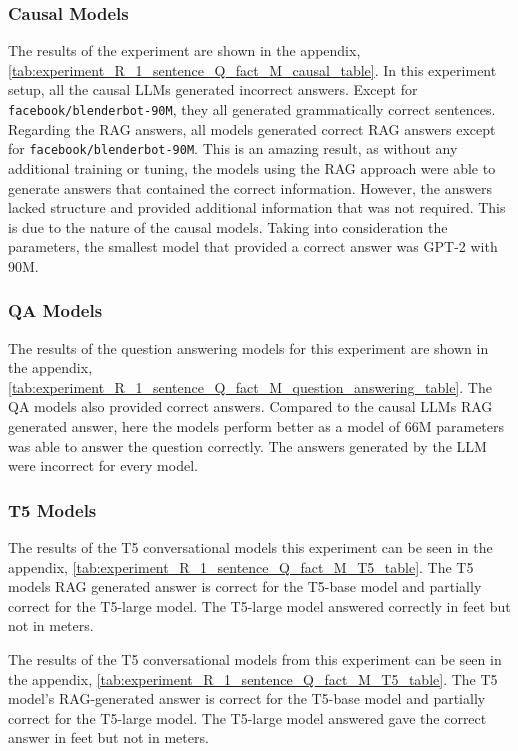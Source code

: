 \documentclass{wseas}
\begin{document}
\subsubsection{Causal Models}

The results of the experiment are shown in the appendix, \autoref{tab:experiment_R_1_sentence_Q_fact_M_causal_table}.
In this experiment setup, all the causal LLMs generated incorrect answers. 
Except for \texttt{facebook/blenderbot-90M}, they all generated grammatically correct sentences. 
Regarding the RAG answers, all models generated correct RAG answers except for \texttt{facebook/blenderbot-90M}.
This is an amazing result, as without any additional training or tuning, the models
using the RAG approach were able to generate answers that contained the correct information.
However, the answers lacked structure and provided additional information that was not required. 
This is due to the nature of the causal models. Taking into consideration the parameters,
the smallest model that provided a correct answer was GPT-2 with 90M.
\subsubsection{QA Models}

The results of the question answering models for this experiment
are shown in the appendix, \autoref{tab:experiment_R_1_sentence_Q_fact_M_question_answering_table}.
The QA models also provided correct answers. Compared to the causal LLMs
RAG generated answer, here the models perform better as a model of 66M parameters
was able to answer the question correctly. The answers generated by the LLM were incorrect for every model.

\subsubsection{T5 Models}


The results of the T5 conversational models this experiment can be seen in the appendix, \autoref{tab:experiment_R_1_sentence_Q_fact_M_T5_table}.
The T5 models RAG generated answer is correct for the T5-base model and partially correct
for the T5-large model. The T5-large model answered correctly in feet but not in meters.

The results of the T5 conversational models from this experiment can be seen in the appendix, \autoref{tab:experiment_R_1_sentence_Q_fact_M_T5_table}. 
The T5 model's RAG-generated answer is correct for the T5-base model and partially correct for the T5-large model. 
The T5-large model answered gave the correct answer in feet but not in meters.
\end{document}
